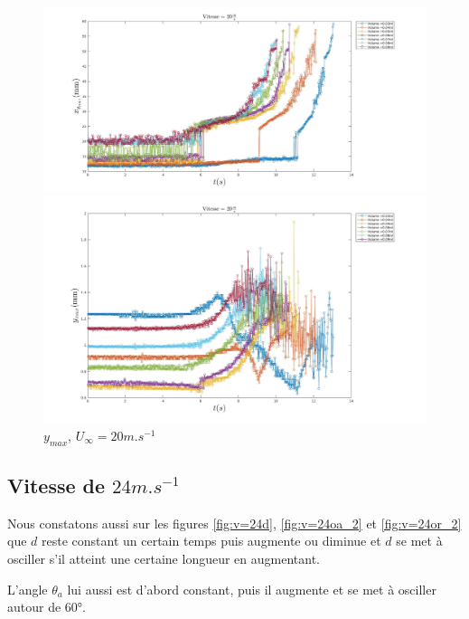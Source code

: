 \begin{figure}[!h]
	\centering
	\begin{minipage}{0.8\linewidth}
	\includegraphics[width = \linewidth]{./image/v=20xm.jpg}
	\caption{$x_{max}$, $U_{\infty}=20m.s^{-1}$}
		\label{fig:v=20xm}
	\end{minipage}
	\begin{minipage}{0.8\linewidth}
	\includegraphics[width = \linewidth]{./image/v=20ym.jpg}
	\caption{$y_{max}$, $U_{\infty}=20m.s^{-1}$}
		\label{fig:v=20ym}
	\end{minipage}
\end{figure}

\newpage
\subsection{Vitesse de $24m.s^{-1}$}

Nous constatons aussi sur les figures \ref{fig:v=24d}, \ref{fig:v=24oa_2} et \ref{fig:v=24or_2} que $d$ reste constant un certain temps puis augmente ou diminue et $d$ se met à osciller s'il atteint une certaine longueur en augmentant.

L'angle $\theta_{a}$ lui aussi est d'abord constant, puis il augmente et se met à osciller autour de $\ang{60}$.

